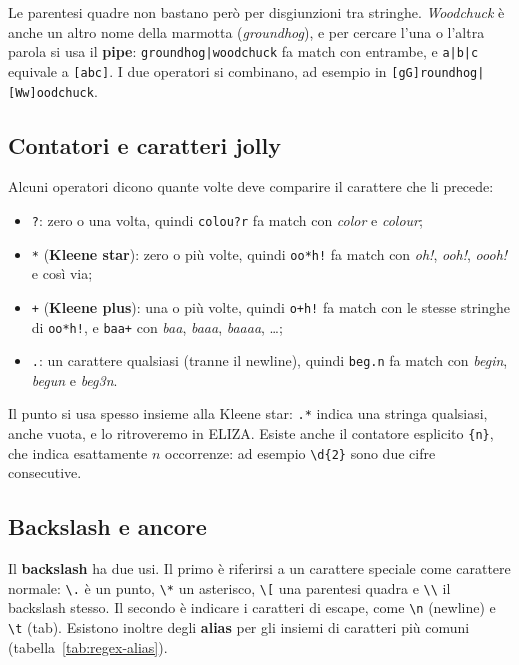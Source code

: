 Le parentesi quadre non bastano però per disgiunzioni tra stringhe. \textit{Woodchuck} è anche un altro nome della marmotta (\textit{groundhog}), e per cercare l'una o l'altra parola si usa il \textbf{pipe}: \verb!groundhog|woodchuck! fa match con entrambe, e \verb!a|b|c! equivale a \verb|[abc]|. I due operatori si combinano, ad esempio in \verb![gG]roundhog|[Ww]oodchuck!.

\subsection{Contatori e caratteri jolly}
Alcuni operatori dicono quante volte deve comparire il carattere che li precede:
\begin{itemize}
    \item \verb|?|: zero o una volta, quindi \verb|colou?r| fa match con \textit{color} e \textit{colour};
    \item \verb|*| (\textbf{Kleene star}): zero o più volte, quindi \verb|oo*h!| fa match con \textit{oh!}, \textit{ooh!}, \textit{oooh!} e così via;
    \item \verb|+| (\textbf{Kleene plus}): una o più volte, quindi \verb|o+h!| fa match con le stesse stringhe di \verb|oo*h!|, e \verb|baa+| con \textit{baa}, \textit{baaa}, \textit{baaaa}, \dots;
    \item \verb|.|: un carattere qualsiasi (tranne il newline), quindi \verb|beg.n| fa match con \textit{begin}, \textit{begun} e \textit{beg3n}.
\end{itemize}
Il punto si usa spesso insieme alla Kleene star: \verb|.*| indica una stringa qualsiasi, anche vuota, e lo ritroveremo in ELIZA. Esiste anche il contatore esplicito \verb|{n}|, che indica esattamente $n$ occorrenze: ad esempio \verb|\d{2}| sono due cifre consecutive.

\subsection{Backslash e ancore}
Il \textbf{backslash} ha due usi. Il primo è riferirsi a un carattere speciale come carattere normale: \verb|\.| è un punto, \verb|\*| un asterisco, \verb|\[| una parentesi quadra e \verb|\\| il backslash stesso. Il secondo è indicare i caratteri di escape, come \verb|\n| (newline) e \verb|\t| (tab). Esistono inoltre degli \textbf{alias} per gli insiemi di caratteri più comuni (tabella~\ref{tab:regex-alias}).

